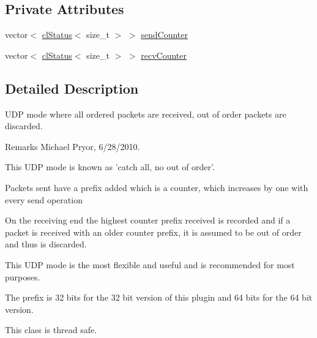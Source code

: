 \subsection*{Private Attributes}
\begin{DoxyCompactItemize}
\item 
vector$<$ \hyperlink{classcl_status}{clStatus}$<$ size\_\-t $>$ $>$ \hyperlink{classcl_catch_all_no_u_d_p_a50669cdeff504e9029f11480453748ab}{sendCounter}
\item 
vector$<$ \hyperlink{classcl_status}{clStatus}$<$ size\_\-t $>$ $>$ \hyperlink{classcl_catch_all_no_u_d_p_a05914d96351f77d9c2b94101f118398c}{recvCounter}
\end{DoxyCompactItemize}


\subsection{Detailed Description}
UDP mode where all ordered packets are received, out of order packets are discarded. \begin{DoxyRemark}{Remarks}
Michael Pryor, 6/28/2010.
\end{DoxyRemark}
This UDP mode is known as 'catch all, no out of order'. \par
\par


Packets sent have a prefix added which is a counter, which increases by one with every send operation \par
 On the receiving end the highest counter prefix received is recorded and if a packet is received with an older counter prefix, it is assumed to be out of order and thus is discarded.\par
\par


This UDP mode is the most flexible and useful and is recommended for most purposes. \par
\par


The prefix is 32 bits for the 32 bit version of this plugin and 64 bits for the 64 bit version. \par
\par


This class is thread safe. 

